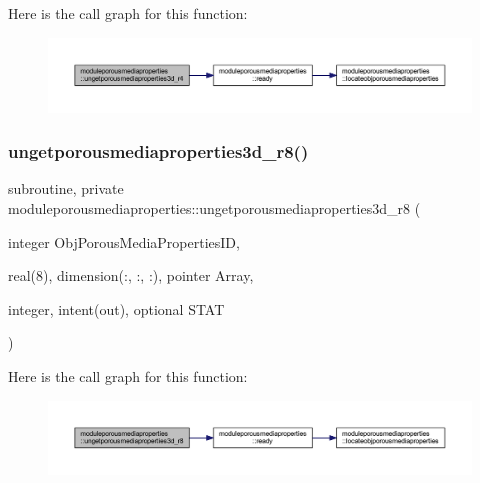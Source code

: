 Here is the call graph for this function\+:\nopagebreak
\begin{figure}[H]
\begin{center}
\leavevmode
\includegraphics[width=350pt]{namespacemoduleporousmediaproperties_ae5667c60b268b4c99e403dc08b831ee5_cgraph}
\end{center}
\end{figure}
\mbox{\label{namespacemoduleporousmediaproperties_adae76989107c8fbe8fc908a111ea82ad}} 
\subsubsection{\texorpdfstring{ungetporousmediaproperties3d\+\_\+r8()}{ungetporousmediaproperties3d\_r8()}}
{\footnotesize\ttfamily subroutine, private moduleporousmediaproperties\+::ungetporousmediaproperties3d\+\_\+r8 (\begin{DoxyParamCaption}\item[{integer}]{Obj\+Porous\+Media\+Properties\+ID,  }\item[{real(8), dimension(\+:, \+:, \+:), pointer}]{Array,  }\item[{integer, intent(out), optional}]{S\+T\+AT }\end{DoxyParamCaption})\hspace{0.3cm}{\ttfamily [private]}}

Here is the call graph for this function\+:\nopagebreak
\begin{figure}[H]
\begin{center}
\leavevmode
\includegraphics[width=350pt]{namespacemoduleporousmediaproperties_adae76989107c8fbe8fc908a111ea82ad_cgraph}
\end{center}
\end{figure}
\mbox{\label{namespacemoduleporousmediaproperties_a81fcc32210036b193860971be2aa8f12}} 
